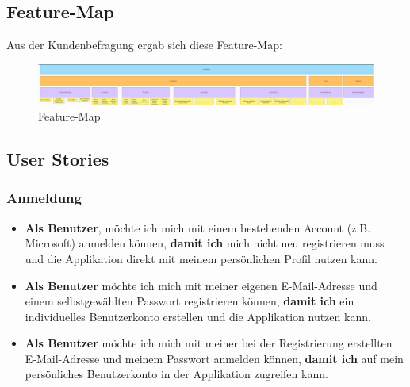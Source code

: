 \documentclass[a4paper,12pt]{article}
\begin{document}

\subsection{Feature-Map}
Aus der Kundenbefragung ergab sich diese Feature-Map:
\begin{figure}[H]
    \centering
    \includegraphics[width=1\textwidth]{Abbildungen/feature_map.png}
    \caption{Feature-Map}
    \label{fig:feature_map}
\end{figure}

\newpage


\subsection{User Stories}


\subsubsection{Anmeldung}
\begin{itemize}
  \item \textbf{Als Benutzer}, möchte ich mich mit einem bestehenden Account (z.B. Microsoft) anmelden können, \textbf{damit ich} mich nicht neu registrieren muss und die Applikation direkt mit meinem persönlichen Profil nutzen kann.
  \item \textbf{Als Benutzer} möchte ich mich mit meiner eigenen E-Mail-Adresse und einem selbstgewählten Passwort registrieren können, \textbf{damit ich} ein individuelles Benutzerkonto erstellen und die Applikation nutzen kann.
  \item \textbf{Als Benutzer} möchte ich mich mit meiner bei der Registrierung erstellten E-Mail-Adresse und meinem Passwort anmelden können, \textbf{damit ich} auf mein persönliches Benutzerkonto in der Applikation zugreifen kann.
\end{itemize}
\end{document}
